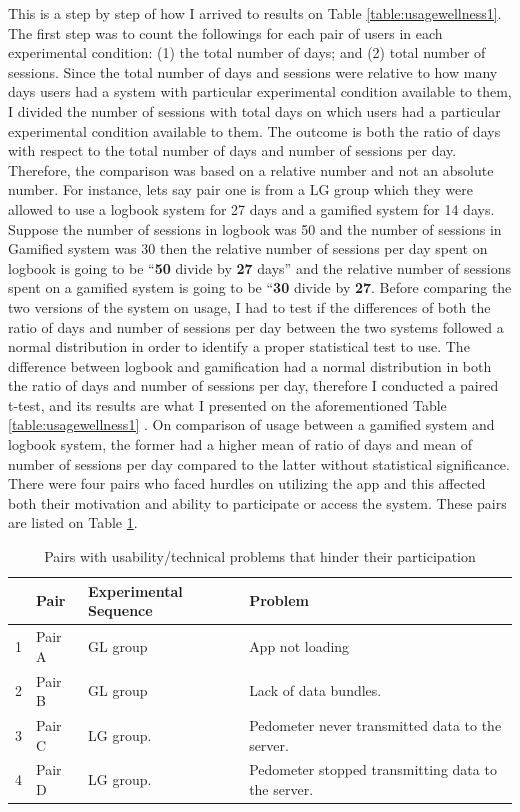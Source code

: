 \newline 
This is a step by step of how I arrived to results on Table \ref{table:usagewellness1}. The first step was to count the followings for each pair of users in each experimental condition: (1) the total number of days; and  (2) total number of sessions. Since the total number of days and sessions were relative to how many days users had a system with particular experimental condition available to them, I divided the number of sessions with total days on which users had a particular experimental condition available to them. The outcome is both the ratio of days with respect to the total number of days and number of sessions per day. Therefore, the comparison was based on a relative number and not an absolute number. For instance, lets say pair one is from a LG group which they were allowed to use a logbook system for 27 days and a gamified system for 14 days. Suppose the number of sessions in logbook was 50 and the number of sessions in Gamified system was 30 then the relative number of sessions per day spent on logbook is going to be ``\textbf{50} divide by \textbf{27} days'' and the relative number of sessions spent on  a gamified system is going to be ``\textbf{30} divide by \textbf{27}. Before comparing the two versions of the system on usage, I had to test if the differences of both the ratio of days and number of sessions per day between the two systems followed a normal distribution in order to identify a proper statistical test to use. The difference between logbook and gamification had a normal distribution in both the ratio of days and number of sessions per day, therefore I conducted a paired t-test, and its results are what I presented on the aforementioned Table \ref{table:usagewellness1} . On comparison of usage between a gamified system and logbook system, the former had a higher mean  of ratio of days  and mean of number of sessions per day compared to the latter without statistical significance.\newline 
There were four pairs who faced hurdles on utilizing the app and this affected both their motivation and ability to participate or access the system. These pairs are listed on Table \ref{table:usageproblems}.\newline
\begin{table}[h!]
  \begin{center}
    \caption{Pairs with usability/technical problems that hinder their participation}
    \label{table:usageproblems}
	\begin{tabular}{|l|l|l|p{6cm}|}
		\hline
		&Pair&Experimental Sequence&Problem\\
		\hline
		1&Pair A&GL group &App not loading\\
		\hline
		2&Pair B&GL group&Lack of data bundles. \\
		\hline
		3&Pair C & LG group.& Pedometer never transmitted data to the server.\\
		\hline
		4&Pair D & LG group.& Pedometer stopped transmitting data to the server.\\
	\hline
	\end{tabular}
  \end{center}
\end{table}
